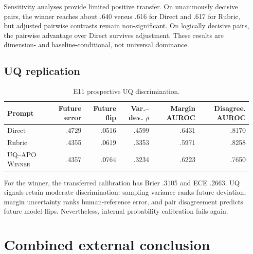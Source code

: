 \documentclass[11pt,twoside,a4paper]{report}
\newcommand{\winner}{\textsc{UQ--APO Winner}}
\begin{document}
Sensitivity analyses provide limited positive transfer.  On unanimously decisive
pairs, the winner reaches about .640 versus .616 for Direct and .617 for Rubric, but
adjusted pairwise contrasts remain non-significant.  On logically decisive pairs,
the pairwise advantage over Direct survives adjustment.  These results are
dimension- and baseline-conditional, not universal dominance.

\subsection{UQ replication}

\begin{table}[htbp]
\centering
\caption{E11 prospective UQ discrimination.}
\label{tab:e11-uq}
\begin{tabular}{lrrrrr}
\toprule
Prompt & Future error & Future flip & Var.--dev. $\rho$ & Margin AUROC & Disagree. AUROC \\
\midrule
Direct & .4729 & .0516 & .4599 & .6431 & .8170 \\
Rubric & .4355 & .0619 & .3353 & .5971 & .8258 \\
\winner & .4357 & .0764 & .3234 & .6223 & .7650 \\
\bottomrule
\end{tabular}
\end{table}

For the winner, the transferred calibration has Brier .3105 and ECE .2663.  UQ
signals retain moderate discrimination: sampling variance ranks future deviation,
margin uncertainty ranks human-reference error, and pair disagreement predicts
future model flips.  Nevertheless, internal probability calibration fails again.

\section{Combined external conclusion}
\end{document}
